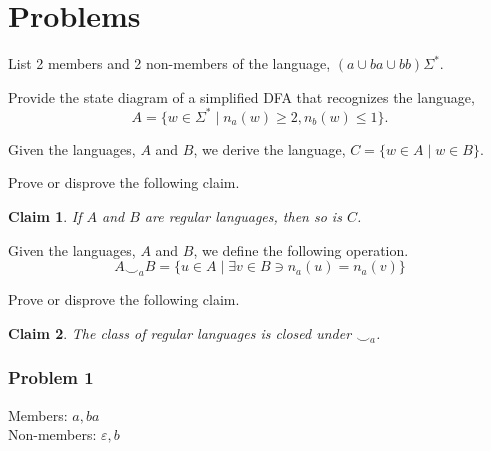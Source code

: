 \documentclass[addpoints]{exam}
\newtheorem{claim}{Claim}
\begin{document}
\section*{Problems}
\begin{questions}

\question[15] List 2 members and 2 non-members of the language, $(a \cup ba \cup bb)\Sigma^*$.

\question[20] Provide the state diagram of a simplified DFA that recognizes the language, 
\[
A=\{w\in\Sigma^* \mid n_a(w) \ge 2, n_b(w) \le 1\}.
\]

\question[30] Given the languages, $A$ and $B$, we derive the language, $C = \{ w\in A \mid w \in B \}$.

Prove or disprove the following claim.
\begin{claim}
If $A$ and $B$ are regular languages, then so is $C$.
\end{claim}

\question[35] Given the languages, $A$ and $B$, we define the following operation.
\[
A\smile_a B = \{ u\in A \mid \exists v\in B \ni n_a(u) = n_a(v) \}
\]

Prove or disprove the following claim.
\begin{claim}
The class of regular languages is closed under $\smile_a$.
\end{claim}

\pagebreak
\begin{solution}
	\vspace*{-5mm}
	\subsubsection*{Problem 1} \vspace*{-2mm}
	Members: $ a, ba $ \\ Non-members: $ \varepsilon, b $


\end{solution}
\end{questions}
\end{document}
